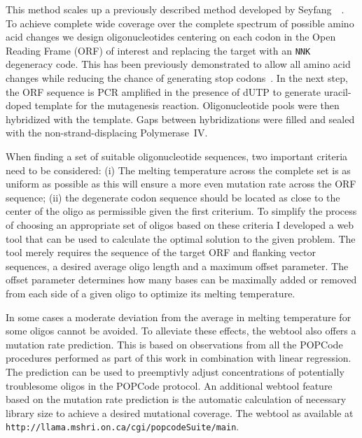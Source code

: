 This method scales up a previously described method developed by Seyfang~\etal~\cite{seyfang}. To achieve complete wide coverage over the complete spectrum of possible amino acid changes we design oligonucleotides centering on each codon in the Open Reading Frame (ORF) of interest and replacing the target with an \texttt{NNK} degeneracy code. This has been previously demonstrated to allow all amino acid changes while reducing the chance of generating stop codons~\cite{36}. 
In the next step, the ORF sequence is PCR amplified in the presence of dUTP to generate uracil-doped template for the mutagenesis reaction. Oligonucleotide pools were then hybridized with the template. Gaps between hybridizations were filled and sealed with the non-strand-displacing  Polymerase~IV. 

When finding a set of suitable oligonucleotide sequences, two important criteria need to be considered: 
(i) The melting temperature across the complete set is as uniform as possible as this will ensure a more even mutation rate across the ORF sequence; (ii) the degenerate codon sequence should be located as close to the center of the oligo as permissible given the first criterium. To simplify the process of choosing an appropriate set of oligos based on these criteria I developed a web tool that can be used to calculate the optimal solution to the given problem. The tool merely requires the sequence of the target ORF and flanking vector sequences, a desired average oligo length and a maximum offset parameter. The offset parameter determines how many bases can be maximally added or removed from each side of a given oligo to optimize its melting temperature. 

In some cases a moderate deviation from the average in melting temperature for some oligos cannot be avoided. To alleviate these effects, the webtool also offers a mutation rate prediction. This is based on observations from all the POPCode procedures performed as part of this work in combination with linear regression. The prediction can be used to preemptivly adjust concentrations of potentially troublesome oligos in the POPCode protocol. An additional webtool feature based on the mutation rate prediction is the automatic calculation of necessary library size to achieve a desired mutational coverage. The webtool as available at \verb|http://llama.mshri.on.ca/cgi/popcodeSuite/main|.


